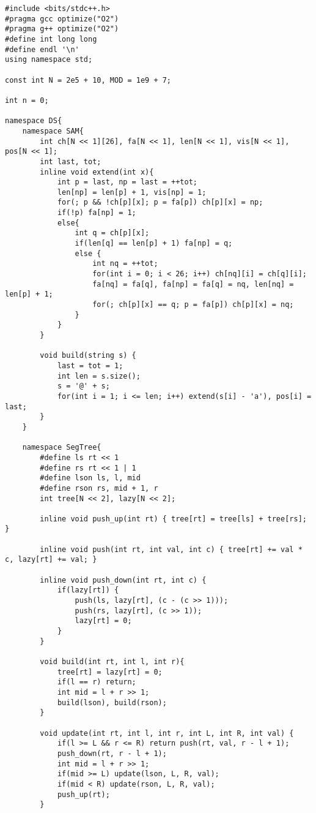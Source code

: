 \documentclass[]{article}
\begin{document}
\begin{verbatim}
#include <bits/stdc++.h>
#pragma gcc optimize("O2")
#pragma g++ optimize("O2")
#define int long long
#define endl '\n'
using namespace std;

const int N = 2e5 + 10, MOD = 1e9 + 7;

int n = 0;

namespace DS{
    namespace SAM{
        int ch[N << 1][26], fa[N << 1], len[N << 1], vis[N << 1], pos[N << 1];
        int last, tot;
        inline void extend(int x){ 
            int p = last, np = last = ++tot;
            len[np] = len[p] + 1, vis[np] = 1;
            for(; p && !ch[p][x]; p = fa[p]) ch[p][x] = np;
            if(!p) fa[np] = 1;
            else{
                int q = ch[p][x];
                if(len[q] == len[p] + 1) fa[np] = q;
                else {
                    int nq = ++tot;
                    for(int i = 0; i < 26; i++) ch[nq][i] = ch[q][i];
                    fa[nq] = fa[q], fa[np] = fa[q] = nq, len[nq] = len[p] + 1;
                    for(; ch[p][x] == q; p = fa[p]) ch[p][x] = nq;
                }
            }
        }   

        void build(string s) {
            last = tot = 1;
            int len = s.size();
            s = '@' + s;
            for(int i = 1; i <= len; i++) extend(s[i] - 'a'), pos[i] = last;
        }
    }

    namespace SegTree{
        #define ls rt << 1
        #define rs rt << 1 | 1
        #define lson ls, l, mid
        #define rson rs, mid + 1, r
        int tree[N << 2], lazy[N << 2];
        
        inline void push_up(int rt) { tree[rt] = tree[ls] + tree[rs]; }

        inline void push(int rt, int val, int c) { tree[rt] += val * c, lazy[rt] += val; }

        inline void push_down(int rt, int c) {
            if(lazy[rt]) {
                push(ls, lazy[rt], (c - (c >> 1)));
                push(rs, lazy[rt], (c >> 1));
                lazy[rt] = 0;
            }
        }

        void build(int rt, int l, int r){
            tree[rt] = lazy[rt] = 0;
            if(l == r) return;
            int mid = l + r >> 1;
            build(lson), build(rson);
        }

        void update(int rt, int l, int r, int L, int R, int val) {
            if(l >= L && r <= R) return push(rt, val, r - l + 1);
            push_down(rt, r - l + 1);
            int mid = l + r >> 1;
            if(mid >= L) update(lson, L, R, val);
            if(mid < R) update(rson, L, R, val);
            push_up(rt);
        }


\end{verbatim}
\end{document}
